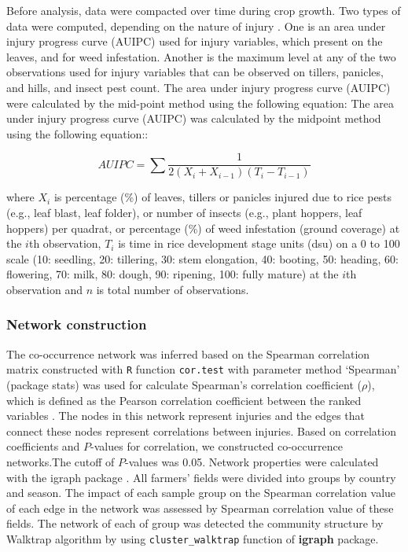 Before analysis, data were compacted over time during crop growth. Two types of data were computed, depending on the nature of injury \citet{Savary_2009_Survey}. One is an area under injury progress curve (AUIPC) used for injury variables, which present on the leaves, and for weed infestation. Another is the maximum level at any of the two observations used for injury variables that can be observed on tillers, panicles, and hills, and insect pest count. The area under injury progress curve (AUIPC) \citep{Campbell_1990_Introduction} were calculated by the mid-point method using the following equation: The area under injury progress curve (AUIPC) was calculated by the midpoint method using the following equation::

\begin{equation}
AUIPC = \sum{\frac{1}{2(X_{i} + X_{i-1})(T_{i} - T_{i-1})}}
\end{equation}

where $X_i$ is percentage (\%) of leaves, tillers or panicles injured due to rice pests (e.g., leaf blast, leaf folder), or number of insects (e.g., plant hoppers, leaf hoppers) per quadrat, or percentage (\%) of weed infestation (ground coverage) at the $i$th observation, $T_i$ is time in rice development stage units (dsu) on a 0 to 100 scale (10: seedling, 20: tillering, 30: stem elongation, 40: booting, 50: heading, 60: flowering, 70: milk, 80: dough, 90: ripening, 100: fully mature) at the $i$th observation and $n$ is total number of observations.

\subsubsection{Network construction}

The co-occurrence network was inferred based on the Spearman correlation matrix constructed with \texttt{R} function \texttt{cor.test} with parameter method `Spearman' (package stats) was used for calculate Spearman's correlation coefficient ($\rho$), which is defined as the Pearson correlation coefficient between the ranked variables \cite{R_2015}. The nodes in this network represent injuries and the edges that connect these nodes represent correlations between injuries. Based on correlation coefficients and $P$-values for correlation, we constructed co-occurrence networks.The cutoff of $P$-values was 0.05. Network properties were calculated with the igraph package \citep{Csardi_2010_igraph}. All farmers' fields were divided into groups by country and season. The impact of each sample group on the Spearman correlation value of each edge in the network was assessed by Spearman correlation value of these fields. The network of each of group was detected the community structure by Walktrap algorithm by using \texttt{cluster\_walktrap} function of \textbf{igraph} package.


